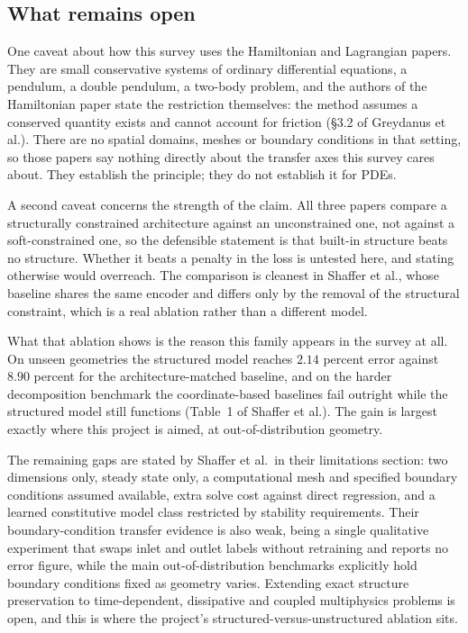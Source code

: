 \documentclass[11pt, a4paper]{article}
\begin{document}
\subsection{What remains open}

One caveat about how this survey uses the Hamiltonian and Lagrangian papers.
They are small
conservative systems of ordinary differential equations, a pendulum, a
double pendulum, a two-body problem, and the authors of the Hamiltonian
paper state the restriction themselves: the method assumes a conserved
quantity exists and cannot account for friction (\S{}3.2 of Greydanus et al.).
There are no spatial domains, meshes or boundary conditions in that setting,
so those papers say nothing directly about the transfer axes this survey
cares about. They establish the principle; they do not establish it for
PDEs.

A second caveat concerns the strength of the claim. All three papers compare
a structurally constrained architecture against an unconstrained one, not
against a soft-constrained one, so the defensible statement is that built-in
structure beats no structure. Whether it beats a penalty in the loss is
untested here, and stating otherwise would overreach. The comparison is
cleanest in Shaffer et al., whose baseline shares the same encoder and
differs only by the removal of the structural constraint, which is a real
ablation rather than a different model.

What that ablation shows is the reason this family appears in the survey at
all. On unseen geometries the structured model reaches $2.14$ percent error
against $8.90$ percent for the architecture-matched baseline, and on the
harder decomposition benchmark the coordinate-based baselines fail outright
while the structured model still functions (Table~1 of Shaffer et al.). The
gain is largest exactly where this project is aimed, at out-of-distribution
geometry.

The remaining gaps are stated by Shaffer et al.\ in their limitations
section: two dimensions only, steady state only, a computational mesh and
specified boundary conditions assumed available, extra solve cost against
direct regression, and a learned constitutive model class restricted by
stability requirements. Their boundary-condition transfer evidence is also
weak, being a single qualitative experiment that swaps inlet and outlet
labels without retraining and reports no error figure, while the main
out-of-distribution benchmarks explicitly hold boundary conditions fixed as
geometry varies. Extending exact structure preservation to time-dependent,
dissipative and coupled multiphysics problems is open, and this is where the
project's structured-versus-unstructured ablation sits.
\end{document}
